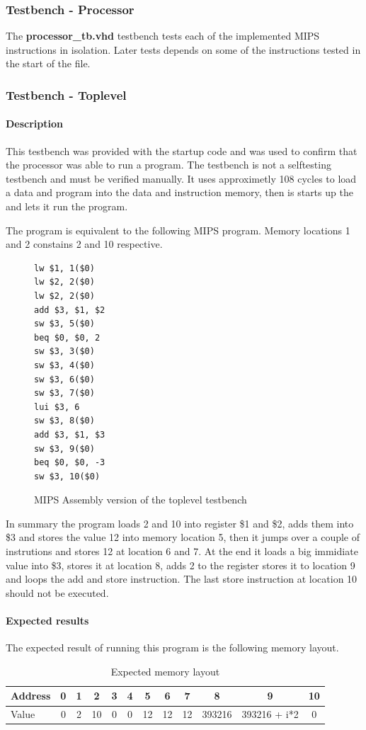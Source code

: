 \subsubsection{Testbench - Processor}
The {\bf processor\_tb.vhd} testbench tests each of the implemented MIPS instructions in isolation. Later tests depends on some of the instructions tested in the start of the file.
\subsubsection{Testbench - Toplevel}

\paragraph{Description}

This testbench was provided with the startup code and was used to confirm that the processor was able to run a program. The testbench is not a selftesting testbench and must be verified manually. It uses approximetly 108 cycles to load a data and program into the data and instruction memory, then is starts up the and lets it run the program.

The program is equivalent to the following MIPS program. Memory locations 1 and 2 constains 2 and 10 respective.

\begin{figure}[h]
\begin{verbatim}
lw $1, 1($0)
lw $2, 2($0)
lw $2, 2($0)
add $3, $1, $2
sw $3, 5($0)
beq $0, $0, 2
sw $3, 3($0)
sw $3, 4($0)
sw $3, 6($0)
sw $3, 7($0)
lui $3, 6
sw $3, 8($0)
add $3, $1, $3
sw $3, 9($0)
beq $0, $0, -3
sw $3, 10($0)
\end{verbatim}
\caption{MIPS Assembly version of the toplevel testbench}
\end{figure}
In summary the program loads 2 and 10 into register \$1 and \$2, adds them into \$3 and stores the value 12 into memory location 5, then it jumps over a couple of instrutions and stores 12 at location 6 and 7. At the end it loads a big immidiate value into \$3, stores it at location 8, adds 2 to the register stores it to location 9 and loops the add and store instruction. The last store instruction at location 10 should not be executed.

\paragraph{Expected results}

The expected result of running this program is the following memory layout. 
\begin{table}[h]
	\begin{tabular}{|l|c|c|c|c|c|c|c|c|c|c|c|}
		\hline
		Address &  0 &  1 &  2 &  3 &  4 &  5 &  6 &  7 &  8 &  9 & 10 \\
		\hline
		Value   &  0 &  2 & 10 &  0 & 0 & 12  & 12 & 12 & 393216 & 393216 + i*2 & 0\\
		\hline
	\end{tabular}
	\caption{Expected memory layout}
\end{table}

